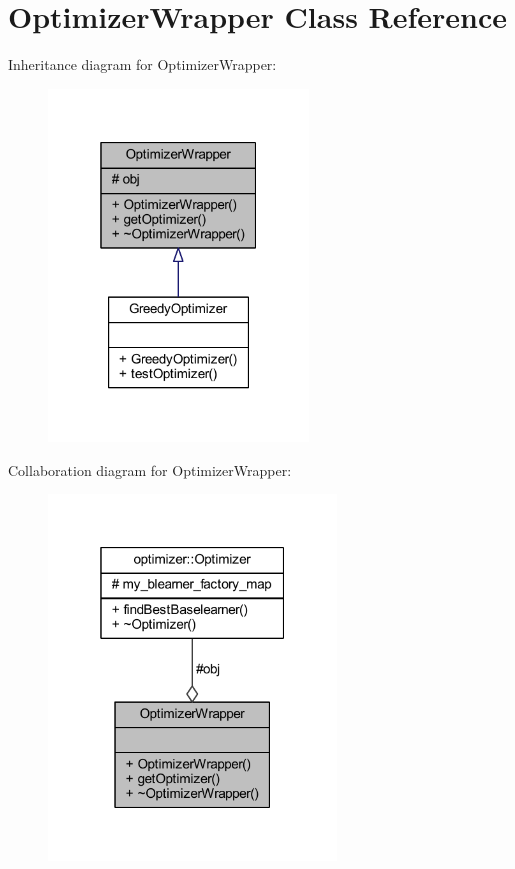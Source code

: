 \hypertarget{class_optimizer_wrapper}{}\section{Optimizer\+Wrapper Class Reference}
\label{class_optimizer_wrapper}


Inheritance diagram for Optimizer\+Wrapper\+:\nopagebreak
\begin{figure}[H]
\begin{center}
\leavevmode
\includegraphics[width=196pt]{class_optimizer_wrapper__inherit__graph}
\end{center}
\end{figure}


Collaboration diagram for Optimizer\+Wrapper\+:\nopagebreak
\begin{figure}[H]
\begin{center}
\leavevmode
\includegraphics[width=217pt]{class_optimizer_wrapper__coll__graph}
\end{center}
\end{figure}
